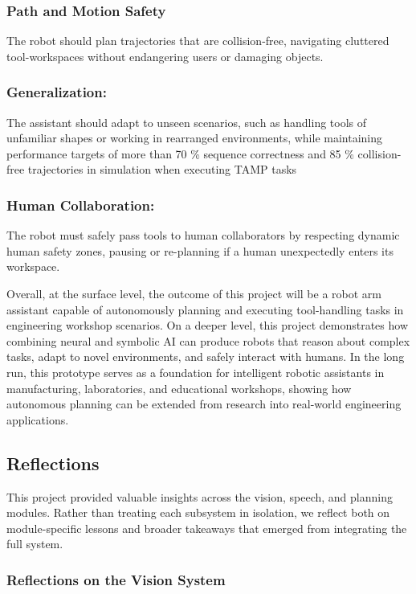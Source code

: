 \documentclass[12pt]{extarticle}
\begin{document}
\subsubsection{Path and Motion Safety}
The robot should plan trajectories that are collision-free, navigating cluttered tool-workspaces without endangering users or damaging objects.

\subsubsection{Generalization:} The assistant should adapt to unseen scenarios, such as handling tools of unfamiliar shapes or working in rearranged environments, while maintaining performance targets of more than 70 \% sequence correctness and 85 \% collision-free trajectories in simulation when executing TAMP tasks~\cite{tamp}

\subsubsection{Human Collaboration:} The robot must safely pass tools to human collaborators by respecting dynamic human safety zones, pausing or re-planning if a human unexpectedly enters its workspace.

Overall, at the surface level, the outcome of this project will be a robot arm assistant capable of autonomously planning and executing tool-handling tasks in engineering workshop scenarios. On a deeper level, this project demonstrates how combining neural and symbolic AI can produce robots that reason about complex tasks, adapt to novel environments, and safely interact with humans. In the long run, this prototype serves as a foundation for intelligent robotic assistants in manufacturing, laboratories, and educational workshops, showing how autonomous planning can be extended from research into real-world engineering applications.

\subsection{Reflections}

This project provided valuable insights across the vision, speech, and planning modules. Rather than treating each subsystem in isolation, we reflect both on module-specific lessons and broader takeaways that emerged from integrating the full system.

\subsubsection{Reflections on the Vision System}
\end{document}
